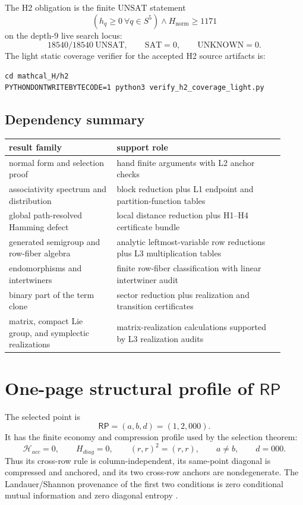 \documentclass[11pt]{article}
\theoremstyle{definition}
\newcommand{\RP}{\mathsf{RP}}
\begin{document}
The H2 obligation is the finite \(\mathrm{UNSAT}\) statement
\[
(h_q\ge0\ \forall q\in S^5)\wedge H_{\mathrm{norm}}\ge1171
\]
on the depth-9 live search locus:
\[
18540/18540\ \mathrm{UNSAT},
\qquad
\mathrm{SAT}=0,
\qquad
\mathrm{UNKNOWN}=0.
\]
The light static coverage verifier for the accepted H2 source artifacts is:
\begin{verbatim}
cd mathcal_H/h2
PYTHONDONTWRITEBYTECODE=1 python3 verify_h2_coverage_light.py
\end{verbatim}

\subsection{Dependency summary}\label{dependency-summary}

\begin{longtable}[]{@{}p{0.36\linewidth}p{0.56\linewidth}@{}}
\toprule\noalign{}
result family & support role \\
\midrule\noalign{}
\endhead
\bottomrule\noalign{}
\endlastfoot
normal form and selection proof & hand finite arguments with L2 anchor checks \\
associativity spectrum and distribution & block reduction plus L1 endpoint and partition-function tables \\
global path-resolved Hamming defect & local distance reduction plus H1--H4 certificate bundle \\
generated semigroup and row-fiber algebra & analytic leftmost-variable row reductions plus L3 multiplication tables \\
endomorphisms and intertwiners & finite row-fiber classification with linear intertwiner audit \\
binary part of the term clone & sector reduction plus realization and transition certificates \\
matrix, compact Lie group, and symplectic realizations & matrix-realization calculations supported by L3 realization audits \\
\end{longtable}

\section[One-page structural profile of RP]{One-page structural profile of \(\RP\)}\label{one-page-structural-profile-rp}

The selected point is
\[
\RP=(a,b,d)=(1,2,000).
\]
It has the finite economy and compression profile used by the selection theorem:
\[
\mathcal H_{acc}=0,
\qquad
H_{diag}=0,
\qquad
(r,r)^2=(r,r),
\qquad
 a\ne b,
\qquad
 d=000.
\]
Thus its cross-row rule is column-independent, its same-point diagonal is compressed
and anchored, and its two cross-row anchors are nondegenerate.  The
Landauer/Shannon provenance of the first two conditions is zero conditional mutual information and zero diagonal entropy
\cite{Landauer1961,Bennett1973,Bennett1982,Shannon1948,CoverThomas2006}.
\end{document}
